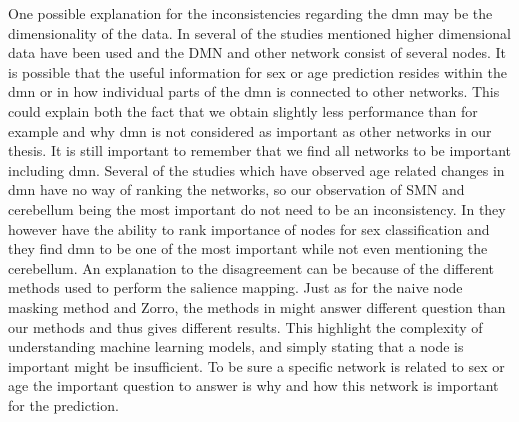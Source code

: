 One possible explanation for the inconsistencies regarding the \acrshort{dmn} may be the dimensionality of the data. In several of the studies mentioned higher dimensional data have been used and the DMN and other network consist of several nodes. It is possible that the useful information for sex or age prediction resides within the \acrshort{dmn} or in how individual parts of the \acrshort{dmn} is connected to other networks. This could explain both the fact that we obtain slightly less performance than for example \cite{arslan, understanding_gnn} and why \acrshort{dmn} is not considered as important as other networks in our thesis. It is still important to remember that we find all networks to be important including \acrshort{dmn}. Several of the studies which have observed age related changes in \acrshort{dmn} \cite{meier_svm, song_reorganizational, tomasi_aging} have no way of ranking the networks, so our observation of SMN and cerebellum being the most important do not need to be an inconsistency. In \cite{arslan, understanding_gnn} they however have the ability to rank importance of nodes for sex classification and they find \acrshort{dmn} to be one of the most important while not even mentioning the cerebellum. An explanation to the disagreement can be because of the different methods used to perform the salience mapping. Just as for the naive node masking method and Zorro, the methods in \cite{understanding_gnn, arslan} might answer different question than our methods and thus gives different results. This highlight the complexity of understanding machine learning models, and simply stating that a node is important might be insufficient. To be sure a specific network is related to sex or age the important question to answer is why and how this network is important for the prediction. 

